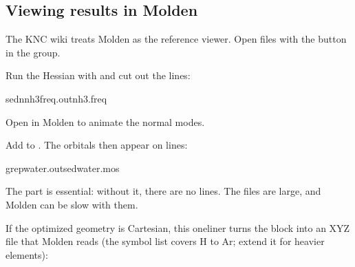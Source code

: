 \documentclass[letterpaper,10pt,english,openany,oneside]{sphinxmanual}
\begin{document}
\subsection{Viewing results in Molden}
\label{\detokenize{start/getting-started:viewing-results-in-molden}}\label{\detokenize{start/getting-started:qs-molden}}
\sphinxAtStartPar
The KNC wiki treats Molden as the reference viewer. Open files with the  button in the  group.



\sphinxAtStartPar
{} Run the Hessian with {\hyperref[\detokenize{reference/control:control-print}]{}} and cut out the  lines:

\begin{sphinxVerbatim}[commandchars=\\\{\}]
sed\PYGZhy{}nnh3\PYGZus{}freq.out\PYGZgt{}nh3.freq
\end{sphinxVerbatim}

\sphinxAtStartPar
Open  in Molden to animate the normal modes. 

\sphinxAtStartPar
{} Add  to . The orbitals then appear on  lines:

\begin{sphinxVerbatim}[commandchars=\\\{\}]
grepwater.outsed\PYGZgt{}water.mos
\end{sphinxVerbatim}



\sphinxAtStartPar
The  part is essential: without it, there are no  lines. The files are large, and Molden can be slow
with them. 

\sphinxAtStartPar
{} If the optimized geometry is Cartesian, this one\sphinxhyphen{}liner turns the  block into an XYZ file that
Molden reads (the symbol list covers H to Ar; extend it for heavier elements):
\end{document}

